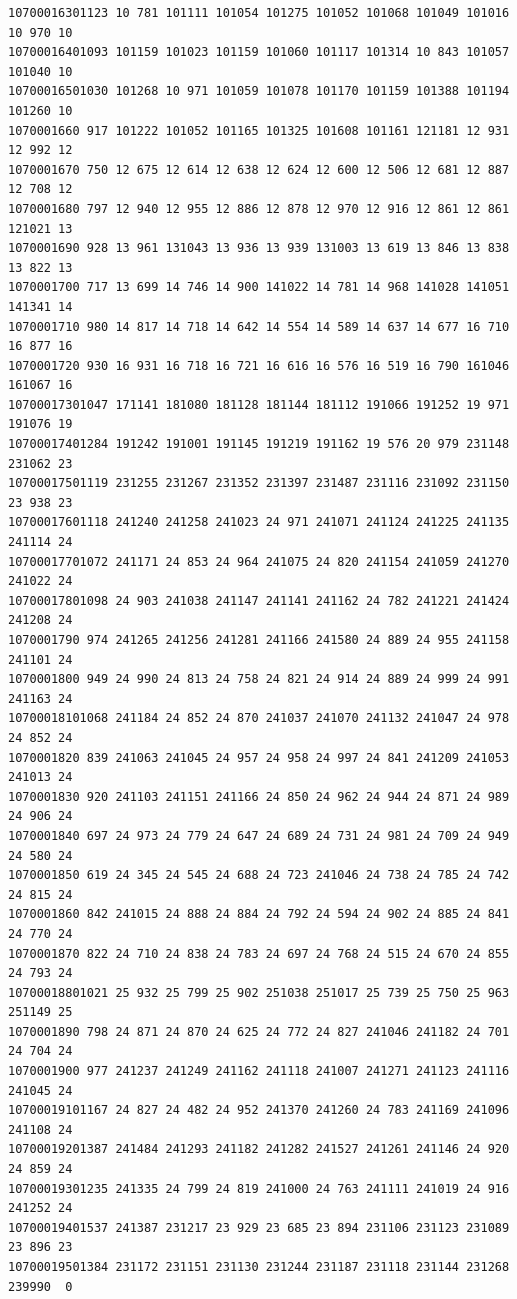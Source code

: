\begin{lstlisting}
10700016301123 10 781 101111 101054 101275 101052 101068 101049 101016 10 970 10
10700016401093 101159 101023 101159 101060 101117 101314 10 843 101057 101040 10
10700016501030 101268 10 971 101059 101078 101170 101159 101388 101194 101260 10
1070001660 917 101222 101052 101165 101325 101608 101161 121181 12 931 12 992 12
1070001670 750 12 675 12 614 12 638 12 624 12 600 12 506 12 681 12 887 12 708 12
1070001680 797 12 940 12 955 12 886 12 878 12 970 12 916 12 861 12 861 121021 13
1070001690 928 13 961 131043 13 936 13 939 131003 13 619 13 846 13 838 13 822 13
1070001700 717 13 699 14 746 14 900 141022 14 781 14 968 141028 141051 141341 14
1070001710 980 14 817 14 718 14 642 14 554 14 589 14 637 14 677 16 710 16 877 16
1070001720 930 16 931 16 718 16 721 16 616 16 576 16 519 16 790 161046 161067 16
10700017301047 171141 181080 181128 181144 181112 191066 191252 19 971 191076 19
10700017401284 191242 191001 191145 191219 191162 19 576 20 979 231148 231062 23
10700017501119 231255 231267 231352 231397 231487 231116 231092 231150 23 938 23
10700017601118 241240 241258 241023 24 971 241071 241124 241225 241135 241114 24
10700017701072 241171 24 853 24 964 241075 24 820 241154 241059 241270 241022 24
10700017801098 24 903 241038 241147 241141 241162 24 782 241221 241424 241208 24
1070001790 974 241265 241256 241281 241166 241580 24 889 24 955 241158 241101 24
1070001800 949 24 990 24 813 24 758 24 821 24 914 24 889 24 999 24 991 241163 24
10700018101068 241184 24 852 24 870 241037 241070 241132 241047 24 978 24 852 24
1070001820 839 241063 241045 24 957 24 958 24 997 24 841 241209 241053 241013 24
1070001830 920 241103 241151 241166 24 850 24 962 24 944 24 871 24 989 24 906 24
1070001840 697 24 973 24 779 24 647 24 689 24 731 24 981 24 709 24 949 24 580 24
1070001850 619 24 345 24 545 24 688 24 723 241046 24 738 24 785 24 742 24 815 24
1070001860 842 241015 24 888 24 884 24 792 24 594 24 902 24 885 24 841 24 770 24
1070001870 822 24 710 24 838 24 783 24 697 24 768 24 515 24 670 24 855 24 793 24
10700018801021 25 932 25 799 25 902 251038 251017 25 739 25 750 25 963 251149 25
1070001890 798 24 871 24 870 24 625 24 772 24 827 241046 241182 24 701 24 704 24
1070001900 977 241237 241249 241162 241118 241007 241271 241123 241116 241045 24
10700019101167 24 827 24 482 24 952 241370 241260 24 783 241169 241096 241108 24
10700019201387 241484 241293 241182 241282 241527 241261 241146 24 920 24 859 24
10700019301235 241335 24 799 24 819 241000 24 763 241111 241019 24 916 241252 24
10700019401537 241387 231217 23 929 23 685 23 894 231106 231123 231089 23 896 23
10700019501384 231172 231151 231130 231244 231187 231118 231144 231268 239990  0
\end{lstlisting}


